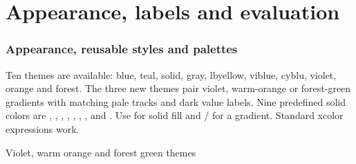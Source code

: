 \part{Appearance, labels and evaluation}

\section{Appearance, reusable styles and palettes}
Ten themes are available: blue, teal, solid, gray, lbyellow, viblue, cyblu,
violet, orange and forest. The three new themes pair violet, warm-orange or
forest-green gradients with matching pale tracks and dark value labels.
Nine predefined solid colors are , ,
, , ,
, ,  and
. Use  for solid fill and
/ for a gradient. Standard xcolor expressions work.

\begin{demo}{Violet, warm orange and forest green themes}


\end{demo}


